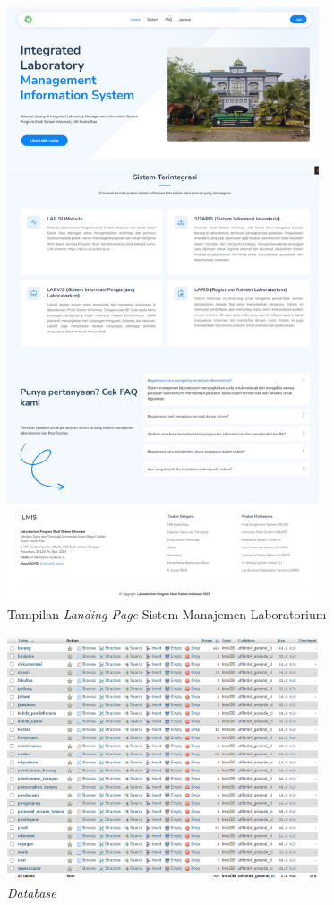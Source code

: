 \begin{figure}
	\centering
	\includegraphics[width=0.82\textwidth]{konten/gambar/hasil/landing-page.jpeg}
	\caption{Tampilan \textit{Landing Page} Sistem Manajemen Laboratorium}
	\label{fig:landing-page}
\end{figure}

\begin{figure}
	\centering
	\includegraphics[width=0.82\textwidth]{konten/gambar/implementasi/database.png}
	\caption{\textit{Database}}
	\label{database-manlab}
\end{figure}

